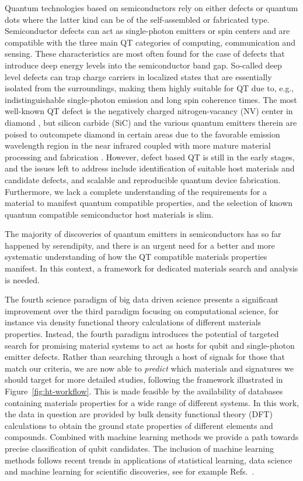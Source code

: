 \documentclass[superscriptaddress,unsortedaddress,
 amsmath,amssymb,
 aps,
]{revtex4-2}
\begin{document}
Quantum technologies based on semiconductors rely on either defects or quantum dots where the latter kind can be of the self-assembled or fabricated type. 
Semiconductor defects can act as single-photon emitters or spin centers and are compatible with the three main QT categories of computing, communication and sensing.  
These characteristics are most often found for the case of defects that introduce deep energy levels into the semiconductor band gap. So-called deep level defects can trap charge carriers in localized states that are essentially isolated from the surroundings, making them highly suitable for QT due to, e.g., indistinguishable single-photon emission and long spin coherence times. 
The most well-known QT defect is the negatively charged nitrogen-vacancy (NV) center in diamond \cite{Doherty_2013}, but silicon carbide (SiC) and the various quantum emitters therein are poised to outcompete diamond in certain areas due to the favorable emission wavelength region in the near infrared coupled with more mature material processing and fabrication \cite{Bathen2021}. 
However, defect based QT is still in the early stages, and the issues left to address include identification of suitable host materials and candidate defects, and scalable and reproducible quantum device fabrication. 
Furthermore, we lack a complete understanding of the requirements for a material to manifest quantum compatible properties,  
and the selection of known quantum compatible semiconductor host materials is slim. 

The majority of discoveries of quantum emitters in semiconductors has so far happened by serendipity, and there is an urgent need for 
a better and more systematic understanding of how the QT compatible materials properties manifest. 
In this context, a framework for dedicated materials search and analysis is needed. 

The fourth science paradigm of big data driven science presents a significant improvement over the third paradigm focusing on computational science, for instance via density functional theory calculations of different materials properties. Instead, the fourth paradigm  introduces the potential of targeted search for promising material systems to act as hosts for qubit and single-photon emitter defects.  
Rather than searching through a host of signals for those that match our criteria, we are now able to \textit{predict} which materials and signatures we should target for more detailed studies, following the framework illustrated in Figure~\ref{fig:ht-workflow}. 
This is made feasible by the availability of databases containing materials properties for a wide range of different systems. In this work, the data in question are provided by bulk density functional theory (DFT) calculations to obtain the ground state properties of different elements and compounds. Combined with machine learning methods we provide a path towards precise classification of qubit candidates. The inclusion of machine learning methods follows recent trends in applications of statistical learning, data science and machine learning for scientific discoveries, see for example Refs.~\cite{deiana2021,Carleo2019}.
\end{document}
